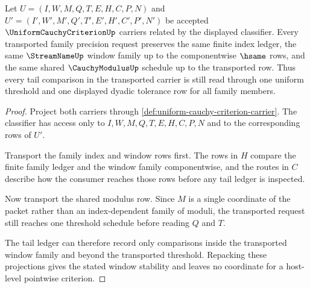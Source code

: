 \begin{theorem}
\label{thm:uniform-cauchy-criterion-window-stability}
Let $U=(I,W,M,Q,T,E,H,C,P,N)$ and $U'=(I',W',M',Q',T',E',H',C',P',N')$ be accepted $\UniformCauchyCriterionUp$ carriers related by the displayed classifier. Every transported family precision request preserves the same finite index ledger, the same $\StreamNameUp$ window family up to the componentwise $\hsame$ rows, and the same shared $\CauchyModulusUp$ schedule up to the transported row. Thus every tail comparison in the transported carrier is still read through one uniform threshold and one displayed dyadic tolerance row for all family members.
\end{theorem}
\begin{proof}
Project both carriers through \autoref{def:uniform-cauchy-criterion-carrier}. The classifier has access only to $I,W,M,Q,T,E,H,C,P,N$ and to the corresponding rows of $U'$.

Transport the family index and window rows first. The rows in $H$ compare the finite family ledger and the window family componentwise, and the routes in $C$ describe how the consumer reaches those rows before any tail ledger is inspected.

Now transport the shared modulus row. Since $M$ is a single coordinate of the packet rather than an index-dependent family of moduli, the transported request still reaches one threshold schedule before reading $Q$ and $T$.

The tail ledger can therefore record only comparisons inside the transported window family and beyond the transported threshold. Repacking these projections gives the stated window stability and leaves no coordinate for a host-level pointwise criterion.
\end{proof}

